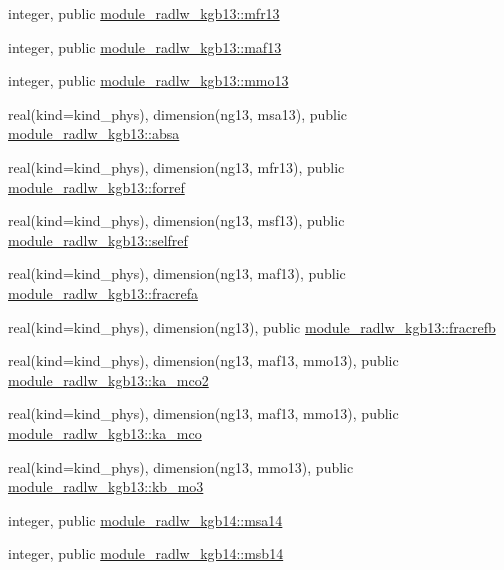 \begin{DoxyCompactItemize}
integer, public \hyperlink{group__module__radlw__main_ga158782c955af9f50aaefea2d49af97ce}{module\+\_\+radlw\+\_\+kgb13\+::mfr13}
\item 
integer, public \hyperlink{group__module__radlw__main_ga1ddc025df872b12194b8c6344cc0204e}{module\+\_\+radlw\+\_\+kgb13\+::maf13}
\item 
integer, public \hyperlink{group__module__radlw__main_gae513ce55829a57a0dbda77f570e4a619}{module\+\_\+radlw\+\_\+kgb13\+::mmo13}
\item 
real(kind=kind\+\_\+phys), dimension(ng13, msa13), public \hyperlink{group__module__radlw__main_ga22ce8d48ac3dceae1d52e80097fc2689}{module\+\_\+radlw\+\_\+kgb13\+::absa}
\item 
real(kind=kind\+\_\+phys), dimension(ng13, mfr13), public \hyperlink{group__module__radlw__main_ga93c6546ef5f8cbfc4f63de29e1ba2452}{module\+\_\+radlw\+\_\+kgb13\+::forref}
\item 
real(kind=kind\+\_\+phys), dimension(ng13, msf13), public \hyperlink{group__module__radlw__main_gac8f58bba6aa4b72ffd01f78e60d0831f}{module\+\_\+radlw\+\_\+kgb13\+::selfref}
\item 
real(kind=kind\+\_\+phys), dimension(ng13, maf13), public \hyperlink{group__module__radlw__main_ga82aed8a05cd528b287e336f7ff8fcebb}{module\+\_\+radlw\+\_\+kgb13\+::fracrefa}
\item 
real(kind=kind\+\_\+phys), dimension(ng13), public \hyperlink{group__module__radlw__main_ga92d45aee9dab62549ea8821eae7422dd}{module\+\_\+radlw\+\_\+kgb13\+::fracrefb}
\item 
real(kind=kind\+\_\+phys), dimension(ng13, maf13, mmo13), public \hyperlink{group__module__radlw__main_ga523a0bc861ea861869f59b7bd007ff50}{module\+\_\+radlw\+\_\+kgb13\+::ka\+\_\+mco2}
\item 
real(kind=kind\+\_\+phys), dimension(ng13, maf13, mmo13), public \hyperlink{group__module__radlw__main_ga0c2f5802f9471c35759cb673dbc8ca05}{module\+\_\+radlw\+\_\+kgb13\+::ka\+\_\+mco}
\item 
real(kind=kind\+\_\+phys), dimension(ng13, mmo13), public \hyperlink{group__module__radlw__main_gacc93fbdd9ce1062cbe9b01973d8ab229}{module\+\_\+radlw\+\_\+kgb13\+::kb\+\_\+mo3}
\item 
integer, public \hyperlink{namespacemodule__radlw__kgb14_a9357fbaa5663438f0c0062a45c99a8d4}{module\+\_\+radlw\+\_\+kgb14\+::msa14}
\item 
integer, public \hyperlink{group__module__radlw__main_ga2d400a2aa969f2b2b6efd15555b67159}{module\+\_\+radlw\+\_\+kgb14\+::msb14}

\end{DoxyCompactItemize}
